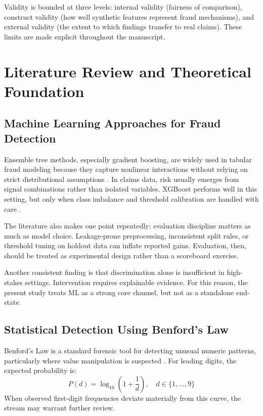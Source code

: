 \documentclass[12pt,a4paper]{report}
\begin{document}
Validity is bounded at three levels: internal validity (fairness of comparison), construct validity (how well synthetic features represent fraud mechanisms), and external validity (the extent to which findings transfer to real claims). These limits are made explicit throughout the manuscript.

\chapter{Literature Review and Theoretical Foundation}

\section{Machine Learning Approaches for Fraud Detection}
Ensemble tree methods, especially gradient boosting, are widely used in tabular fraud modeling because they capture nonlinear interactions without relying on strict distributional assumptions \citep{chen2016}. In claims data, risk usually emerges from signal combinations rather than isolated variables. XGBoost performs well in this setting, but only when class imbalance and threshold calibration are handled with care \citep{chawla2002}.

The literature also makes one point repeatedly: evaluation discipline matters as much as model choice. Leakage-prone preprocessing, inconsistent split rules, or threshold tuning on holdout data can inflate reported gains. Evaluation, then, should be treated as experimental design rather than a scoreboard exercise.

Another consistent finding is that discrimination alone is insufficient in high-stakes settings. Intervention requires explainable evidence. For this reason, the present study treats ML as a strong core channel, but not as a standalone end-state.

\section{Statistical Detection Using Benford's Law}
Benford's Law is a standard forensic tool for detecting unusual numeric patterns, particularly where value manipulation is suspected \citep{benford1938,durtschi2004}. For leading digits, the expected probability is:
\begin{equation}
P(d) = \log_{10}\left(1 + \frac{1}{d}\right), \quad d \in \{1,\dots,9\}
\end{equation}
When observed first-digit frequencies deviate materially from this curve, the stream may warrant further review.
\end{document}

